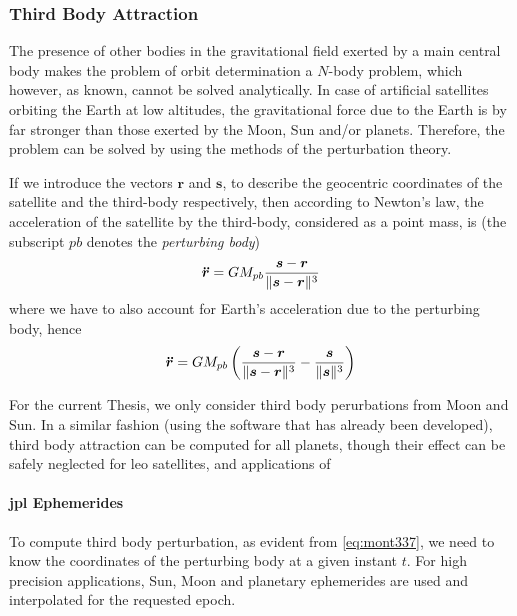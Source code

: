 \subsubsection{Third Body Attraction}\label{sssec:third-body-perturbations}

The presence of other bodies in the gravitational ﬁeld exerted by a main central
body makes the problem of orbit determination a $N$-body problem, which however, as known, 
cannot be solved analytically. In case of artiﬁcial satellites orbiting the Earth 
at low altitudes, the gravitational force due to the Earth is by far stronger than 
those exerted by the Moon, Sun and/or planets. Therefore, the problem can be solved 
by using the methods of the perturbation theory.

If we introduce the vectors $\bm{r}$ and $\bm{s}$, to describe the geocentric 
coordinates of the satellite and the third-body respectively, then according to 
Newton's law, the acceleration of the satellite by the third-body, considered as 
a point mass, is (the subscript $pb$ denotes the \emph{perturbing body})
\begin{equation}
    \bm{\ddot{r}} = GM_{pb} \frac{\bm{s}-\bm{r}}
        {\lVert\bm{s}-\bm{r}\rVert^3}
\end{equation}
where we have to also account for Earth's acceleration due to the perturbing body, 
hence
\begin{equation}\label{eq:mont337}
    \bm{\ddot{r}} = GM_{pb} \left( 
        \frac{\bm{s}-\bm{r}}{\lVert\bm{s}-\bm{r}\rVert^3} 
        - \frac{\bm{s}}{\lVert\bm{s}\rVert^3} \right)
\end{equation}

For the current Thesis, we only consider third body perurbations from Moon and Sun. 
In a similar fashion (using the software that has already been developed), third body 
attraction can be computed for all planets, though their effect can be safely neglected 
for \gls{leo} satellites, and applications of 

\paragraph{\gls{jpl} Ephemerides}\label{par:jpl-ephemerides}

To compute third body perturbation, as evident from \ref{eq:mont337}, we need to 
know the coordinates of the perturbing body at a given instant $t$. For high 
precision applications, Sun, Moon and planetary ephemerides are used and interpolated 
for the requested epoch.

